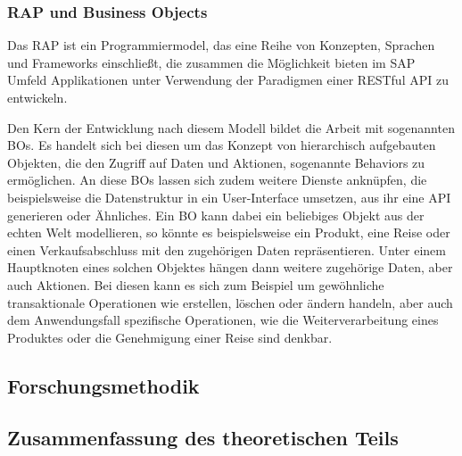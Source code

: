 \subsubsection*{RAP und Business Objects}
Das \ac{RAP} ist ein Programmiermodel, das eine Reihe von Konzepten, Sprachen und Frameworks einschließt, die zusammen die Möglichkeit bieten im SAP Umfeld Applikationen unter Verwendung der Paradigmen einer \ac*{REST}ful \ac{API} zu entwickeln. \citepls

Den Kern der Entwicklung nach diesem Modell bildet die Arbeit mit sogenannten \ac{BO}s. Es handelt sich bei diesen um das Konzept von hierarchisch aufgebauten Objekten, die den Zugriff auf Daten und Aktionen, sogenannte Behaviors zu ermöglichen. An diese \ac{BO}s lassen sich zudem weitere Dienste anknüpfen, die beispielsweise die Datenstruktur in ein User-Interface umsetzen, aus ihr eine \ac{API} generieren oder Ähnliches. Ein \ac{BO} kann dabei ein beliebiges Objekt aus der echten Welt modellieren, so könnte es beispielsweise ein Produkt, eine Reise oder einen Verkaufsabschluss mit den zugehörigen Daten repräsentieren. Unter einem Hauptknoten eines solchen Objektes hängen dann weitere zugehörige Daten, aber auch Aktionen. Bei diesen kann es sich zum Beispiel um gewöhnliche transaktionale Operationen wie erstellen, löschen oder ändern handeln, aber auch dem Anwendungsfall spezifische Operationen, wie die Weiterverarbeitung eines Produktes oder die Genehmigung einer Reise sind denkbar.\citepls

\subsection{Forschungsmethodik}
\subsection{Zusammenfassung des theoretischen Teils}
